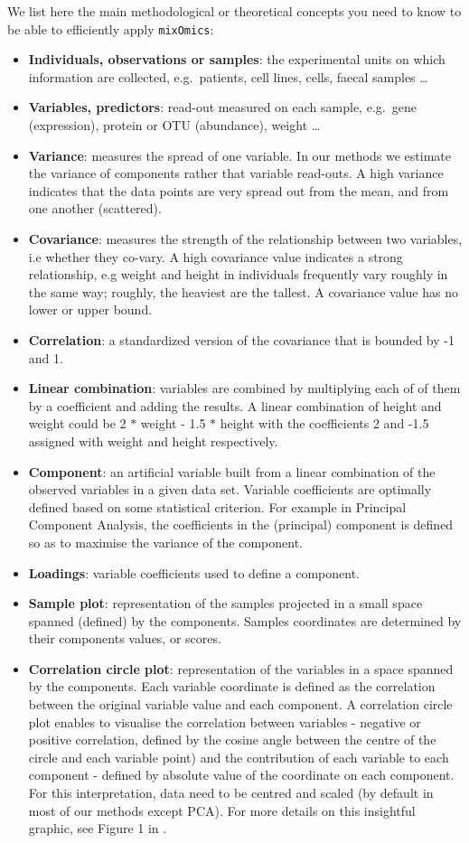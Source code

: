 \documentclass[]{book}
\begin{document}
We list here the main methodological or theoretical concepts you need to know to be able to efficiently apply \texttt{mixOmics}:

\begin{itemize}
\item
  \textbf{Individuals, observations or samples}: the experimental units on which information are collected, e.g.~patients, cell lines, cells, faecal samples \ldots{}
\item
  \textbf{Variables, predictors}: read-out measured on each sample, e.g.~gene (expression), protein or OTU (abundance), weight \ldots{}
\item
  \textbf{Variance}: measures the spread of one variable. In our methods we estimate the variance of components rather that variable read-outs. A high variance indicates that the data points are very spread out from the mean, and from one another (scattered).
\item
  \textbf{Covariance}: measures the strength of the relationship between two variables, i.e whether they co-vary. A high covariance value indicates a strong relationship, e.g weight and height in individuals frequently vary roughly in the same way; roughly, the heaviest are the tallest. A covariance value has no lower or upper bound.
\item
  \textbf{Correlation}: a standardized version of the covariance that is bounded by -1 and 1.
\item
  \textbf{Linear combination}: variables are combined by multiplying each of of them by a coefficient and adding the results. A linear combination of height and weight could be 2 \(*\) weight - 1.5 \(*\) height with the coefficients 2 and -1.5 assigned with weight and height respectively.
\item
  \textbf{Component}: an artificial variable built from a linear combination of the observed variables in a given data set. Variable coefficients are optimally defined based on some statistical criterion. For example in Principal Component Analysis, the coefficients in the (principal) component is defined so as to maximise the variance of the component.
\item
  \textbf{Loadings}: variable coefficients used to define a component.
\item
  \textbf{Sample plot}: representation of the samples projected in a small space spanned (defined) by the components. Samples coordinates are determined by their components values, or scores.
\item
  \textbf{Correlation circle plot}: representation of the variables in a space spanned by the components. Each variable coordinate is defined as the correlation between the original variable value and each component. A correlation circle plot enables to visualise the correlation between variables - negative or positive correlation, defined by the cosine angle between the centre of the circle and each variable point) and the contribution of each variable to each component - defined by absolute value of the coordinate on each component. For this interpretation, data need to be centred and scaled (by default in most of our methods except PCA). For more details on this insightful graphic, see Figure 1 in \citep{Gon12}.

\end{itemize}
\end{document}
